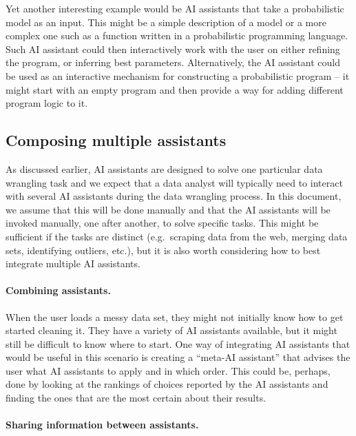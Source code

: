 \documentclass{article}
\begin{document}
Yet another interesting example would be AI assistants that take a probabilistic model as an 
input. This might be a simple description of a model or a more complex one such as a function
written in a probabilistic programming language. Such AI assistant could then interactively
work with the user on either refining the program, or inferring best parameters. Alternatively,
the AI assistant could be used as an interactive mechanism for constructing a probabilistic 
program -- it might start with an empty program and then provide a way for adding different 
program logic to it.


\subsection{Composing multiple assistants}

As discussed earlier, AI assistants are designed to solve one particular data wrangling task and
we expect that a data analyst will typically need to interact with several AI assistants during 
the data wrangling process. In this document, we assume that this will be done manually and that
the AI assistants will be invoked manually, one after another, to solve specific tasks. This 
might be sufficient if the tasks are distinct (e.g.~scraping data from the web, merging data
sets, identifying outliers, etc.), but it is also worth considering how to best integrate multiple 
AI assistants.


\paragraph{Combining assistants.}
When the user loads a messy data set, they might not initially know how to get started cleaning
it. They have a variety of AI assistants available, but it might still be difficult to know
where to start. One way of integrating AI assistants that would be useful in this scenario is
creating a ``meta-AI assistant'' that advises the user what AI assistants to apply and in which
order. This could be, perhaps, done by looking at the rankings of choices reported by the AI
assistants and finding the ones that are the most certain about their results.

\paragraph{Sharing information between assistants.}
\end{document}
